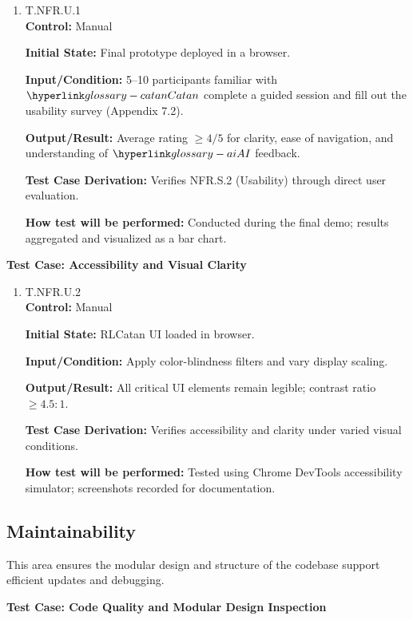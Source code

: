 \documentclass[12pt, titlepage]{article}
\begin{document}
\begin{enumerate}
\item T.NFR.U.1 \\
\textbf{Control:} Manual

\textbf{Initial State:} Final prototype deployed in a browser.

\textbf{Input/Condition:} 5--10 participants familiar with $\Catan{}$ complete a guided session and fill out the usability survey (Appendix 7.2).

\textbf{Output/Result:} Average rating $\geq 4/5$ for clarity, ease of navigation, and understanding of $\AI{}$ feedback.

\textbf{Test Case Derivation:} Verifies NFR.S.2 (Usability) through direct user evaluation.

\textbf{How test will be performed:} Conducted during the final demo; results aggregated and visualized as a bar chart.
\end{enumerate}

\textbf{Test Case: Accessibility and Visual Clarity}

\begin{enumerate}
\item T.NFR.U.2 \\
\textbf{Control:} Manual

\textbf{Initial State:} RLCatan UI loaded in browser.

\textbf{Input/Condition:} Apply color-blindness filters and vary display scaling.

\textbf{Output/Result:} All critical UI elements remain legible; contrast ratio $\geq 4.5:1$.

\textbf{Test Case Derivation:} Verifies accessibility and clarity under varied visual conditions.

\textbf{How test will be performed:} Tested using Chrome DevTools accessibility simulator; screenshots recorded for documentation.
\end{enumerate}

\subsection{Maintainability}

This area ensures the modular design and structure of the codebase support efficient updates and debugging.

\textbf{Test Case: Code Quality and Modular Design Inspection}
\end{document}

